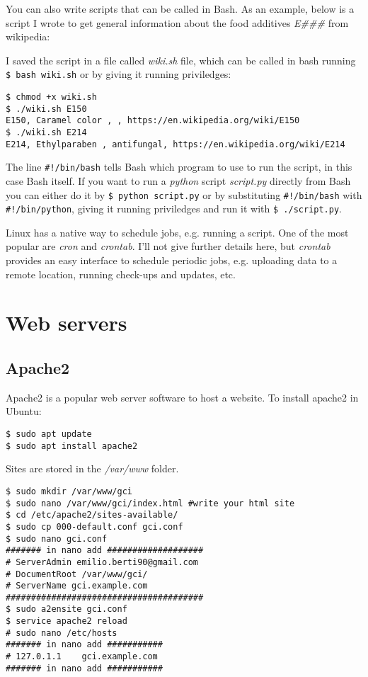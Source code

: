 \documentclass{book}
\begin{document}
You can also write scripts that can be called in Bash. As an example, below is a script I wrote to get general information about the food additives \textit{E\#\#\#} from wikipedia:



I saved the script in a file called \textit{wiki.sh} file, which can be called in bash running \lstinline[columns=fixed]{$ bash wiki.sh} or by giving it running priviledges:

\begin{lstlisting}
$ chmod +x wiki.sh
$ ./wiki.sh E150
E150, Caramel color , , https://en.wikipedia.org/wiki/E150
$ ./wiki.sh E214
E214, Ethylparaben , antifungal, https://en.wikipedia.org/wiki/E214
\end{lstlisting}

The line \lstinline[columns=fixed]{#!/bin/bash} tells Bash which program to use to run the script, in this case Bash itself. If you want to run a \textit{python} script \textit{script.py} directly from Bash you can either do it by \lstinline[columns=fixed]{$ python script.py} or by substituting \lstinline[columns=fixed]{#!/bin/bash} with \lstinline[columns=fixed]{#!/bin/python}, giving it running priviledges and run it with \lstinline[columns=fixed]{$ ./script.py}.

Linux has a native way to schedule jobs, e.g. running a script. One of the most popular are \textit{cron} and \textit{crontab}. I'll not give further details here, but \textit{crontab} provides an easy interface to schedule periodic jobs, e.g. uploading data to a remote location, running check-ups and updates, etc.

\chapter{Web servers}

\section{Apache2}

Apache2 is a popular web server software to host a website. To install apache2 in Ubuntu:

\begin{lstlisting}
$ sudo apt update
$ sudo apt install apache2
\end{lstlisting}

Sites are stored in the \textit{/var/www} folder.

\begin{lstlisting}
$ sudo mkdir /var/www/gci
$ sudo nano /var/www/gci/index.html #write your html site
$ cd /etc/apache2/sites-available/
$ sudo cp 000-default.conf gci.conf
$ sudo nano gci.conf
####### in nano add ###################
# ServerAdmin emilio.berti90@gmail.com
# DocumentRoot /var/www/gci/
# ServerName gci.example.com
#######################################
$ sudo a2ensite gci.conf
$ service apache2 reload
# sudo nano /etc/hosts
####### in nano add ###########
# 127.0.1.1    gci.example.com
####### in nano add ###########
\end{lstlisting}
\end{document}
